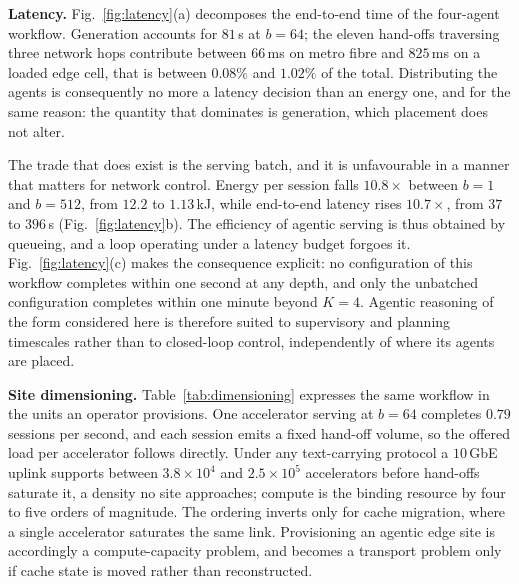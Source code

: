 \documentclass[journal]{IEEEtran}
\newif\ifshowchanges \showchangestrue
\newcommand{\OLD}{\ifshowchanges\color{black}\fi}
\begin{document}
\textbf{Latency.} Fig.~\ref{fig:latency}(a) decomposes the end-to-end time of the four-agent
workflow. Generation accounts for $81$\,s at $b=64$; the eleven hand-offs traversing three network
hops contribute between $66$\,ms on metro fibre and $825$\,ms on a loaded edge cell, that is
between $0.08\%$ and $1.02\%$ of the total. Distributing the agents is consequently no more a
latency decision than an energy one, and for the same reason: the quantity that dominates is
generation, which placement does not alter.

The trade that does exist is the serving batch, and it is unfavourable in a manner that matters
for network control. Energy per session falls $10.8\times$ between $b=1$ and $b=512$, from $12.2$
to $1.13$\,kJ, while end-to-end latency rises $10.7\times$, from $37$ to $396$\,s
(Fig.~\ref{fig:latency}b). The efficiency of agentic serving is thus obtained by queueing, and a
loop operating under a latency budget forgoes it. Fig.~\ref{fig:latency}(c) makes the consequence
explicit: no configuration of this workflow completes within one second at any depth, and only the
unbatched configuration completes within one minute beyond $K=4$. Agentic reasoning of the form
considered here is therefore suited to supervisory and planning timescales rather than to
closed-loop control, independently of where its agents are placed.

\textbf{Site dimensioning.} Table~\ref{tab:dimensioning} expresses the same workflow in the units
an operator provisions. One accelerator serving at $b=64$ completes $0.79$ sessions per second,
and each session emits a fixed hand-off volume, so the offered load per accelerator follows
directly. Under any text-carrying protocol a $10$\,GbE uplink supports between $3.8\times10^{4}$
and $2.5\times10^{5}$ accelerators before hand-offs saturate it, a density no site approaches;
compute is the binding resource by four to five orders of magnitude. The ordering inverts only for
cache migration, where a single accelerator saturates the same link. Provisioning an agentic edge
site is accordingly a compute-capacity problem, and becomes a transport problem only if cache
state is moved rather than reconstructed.
\endgroup\OLD{}

\end{document}
